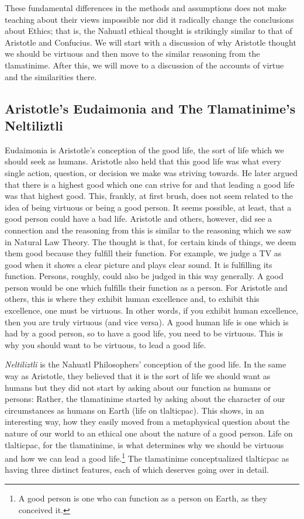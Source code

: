 These fundamental differences in the methods and assumptions does not make teaching about their views impossible nor did it radically change the conclusions about Ethics; that is, the Nahuatl ethical thought is strikingly similar to that of Aristotle and Confucius. We will start with a discussion of why Aristotle thought we should be virtuous and then move to the similar reasoning from the tlamatinime. After this, we will move to a discussion of the accounts of virtue and the similarities there.

\subsection{Aristotle's Eudaimonia and The Tlamatinime's Neltiliztli} 

Eudaimonia is Aristotle's conception of the good life, the sort of life which we should seek as humans. Aristotle also held that this good life was what every single action, question, or decision we make was striving towards. He later argued that there is a highest good which one can strive for and that leading a good life was that highest good. This, frankly, at first brush, does not seem related to the idea of being virtuous or being a good person. It seems possible, at least, that a good person could have a bad life. Aristotle and others, however, did see a connection and the reasoning from this is similar to the reasoning which we saw in Natural Law Theory. The thought is that, for certain kinds of things, we deem them good because they fulfill their function. For example, we judge a TV as good when it shows a clear picture and plays clear sound. It is fulfilling its function. Persons, roughly, could also be judged in this way generally. A good person would be one which fulfills their function as a person. For Aristotle and others, this is where they exhibit human excellence and, to exhibit this excellence, one must be virtuous. In other words, if you exhibit human excellence, then you are truly virtuous (and vice versa). A good human life is one which is had by a good person, so to have a good life, you need to be virtuous. This is why you should want to be virtuous, to lead a good life. 


\emph{Neltiliztli} is the Nahuatl Philosophers' conception of the good life. In the same way as Aristotle, they believed that it is the sort of life we should want as humans but they did not start by asking about our function as humans or persons: Rather, the tlamatinime started by asking about the character of our circumstances as humans on Earth (life on tlalticpac). This shows, in an interesting way, how they easily moved from a metaphysical question about the nature of our world to an ethical one about the nature of a good person. Life on tlalticpac, for the tlamatinime, is what determines why we should be virtuous and how we can lead a good life.\footnote{A good person is one who can function as a person on Earth, as they conceived it.} The tlamatinime conceptualized tlalticpac as having three distinct features, each of which deserves going over in detail.

